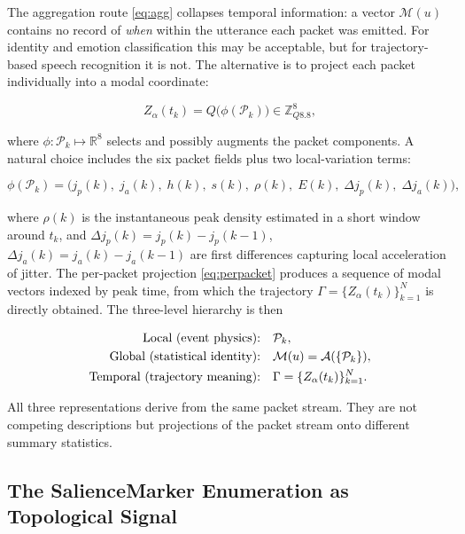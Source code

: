 \documentclass[12pt, a4paper]{article}
\begin{document}
The aggregation route \eqref{eq:agg} collapses temporal information: a vector $\mathcal{M}(u)$ contains no record of \emph{when} within the utterance each packet was emitted. For identity and emotion classification this may be acceptable, but for trajectory-based speech recognition it is not. The alternative is to project each packet individually into a modal coordinate:

\begin{equation}
Z_\alpha(t_k) = Q\bigl(\phi(\mathcal{P}_k)\bigr) \in \mathbb{Z}_{Q8.8}^8,
\label{eq:perpacket}
\end{equation}

where $\phi : \mathcal{P}_k \mapsto \mathbb{R}^8$ selects and possibly augments the packet components. A natural choice includes the six packet fields plus two local-variation terms:

\begin{equation}
\phi(\mathcal{P}_k) = \bigl(j_p(k),\; j_a(k),\; h(k),\; s(k),\; \rho(k),\; E(k),\; \Delta j_p(k),\; \Delta j_a(k)\bigr),
\label{eq:phi}
\end{equation}

where $\rho(k)$ is the instantaneous peak density estimated in a short window around $t_k$, and $\Delta j_p(k) = j_p(k) - j_p(k-1)$, $\Delta j_a(k) = j_a(k) - j_a(k-1)$ are first differences capturing local acceleration of jitter. The per-packet projection \eqref{eq:perpacket} produces a sequence of modal vectors indexed by peak time, from which the trajectory $\Gamma = \{Z_\alpha(t_k)\}_{k=1}^N$ is directly obtained. The three-level hierarchy is then

\begin{align}
\text{Local (event physics):} \quad &\mathcal{P}_k, \notag\\
\text{Global (statistical identity):} \quad &\mathcal{M}(u) = \mathcal{A}(\{\mathcal{P}_k\}), \label{eq:hierarchy}\\
\text{Temporal (trajectory meaning):} \quad &\Gamma = \{Z_\alpha(t_k)\}_{k=1}^N. \notag
\end{align}

All three representations derive from the same packet stream. They are not competing descriptions but projections of the packet stream onto different summary statistics.

\subsection{The SalienceMarker Enumeration as Topological Signal}
\end{document}
